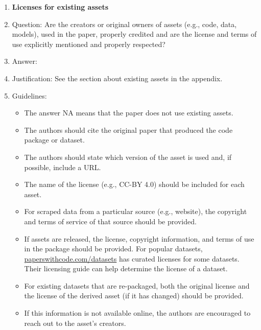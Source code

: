 \documentclass{article}
\begin{document}
\begin{enumerate}
\item {\bf Licenses for existing assets}
    \item[] Question: Are the creators or original owners of assets (e.g., code, data, models), used in the paper, properly credited and are the license and terms of use explicitly mentioned and properly respected?
    \item[] Answer: \answerYes{} %
    \item[] Justification: See the section about existing assets in the appendix.
    \item[] Guidelines:
    \begin{itemize}
        \item The answer NA means that the paper does not use existing assets.
        \item The authors should cite the original paper that produced the code package or dataset.
        \item The authors should state which version of the asset is used and, if possible, include a URL.
        \item The name of the license (e.g., CC-BY 4.0) should be included for each asset.
        \item For scraped data from a particular source (e.g., website), the copyright and terms of service of that source should be provided.
        \item If assets are released, the license, copyright information, and terms of use in the package should be provided. For popular datasets, \url{paperswithcode.com/datasets} has curated licenses for some datasets. Their licensing guide can help determine the license of a dataset.
        \item For existing datasets that are re-packaged, both the original license and the license of the derived asset (if it has changed) should be provided.
        \item If this information is not available online, the authors are encouraged to reach out to the asset's creators.
    \end{itemize}


\end{enumerate}
\end{document}
